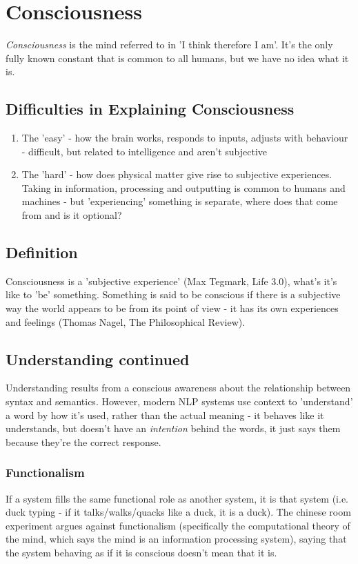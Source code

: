 \section{Consciousness}
\emph{Consciousness} is the mind referred to in 'I think therefore I am'. It's the only fully known constant that is common to all humans, but we have no idea what it is. 

\subsection{Difficulties in Explaining Consciousness}
\begin{enumerate}
    \item The 'easy' - how the brain works, responds to inputs, adjusts with behaviour - difficult, but related to intelligence and aren't subjective
    \item The 'hard' - how does physical matter give rise to subjective experiences. Taking in information, processing and outputting is common to humans and machines - but 'experiencing' something is separate, where does that come from and is it optional? 
\end{enumerate}


\subsection{Definition}
Consciousness is a 'subjective experience' (Max Tegmark, Life 3.0), what's it's like to 'be' something. Something is said to be conscious if there is a subjective way the world appears to be from its point of view - it has its own experiences and feelings (Thomas Nagel, The Philosophical Review). 

\subsection{Understanding continued}
Understanding results from a conscious awareness about the relationship between syntax and semantics. However, modern NLP systems use context to 'understand' a word by how it's used, rather than the actual meaning - it behaves like it understands, but doesn't have an \emph{intention} behind the words, it just says them because they're the correct response.

\subsubsection{Functionalism}
If a system fills the same functional role as another system, it is that system (i.e. duck typing - if it talks/walks/quacks like a duck, it is a duck). The chinese room experiment argues against functionalism (specifically the computational theory of the mind, which says the mind is an information processing system), saying that the system behaving as if it is conscious doesn't mean that it is. 

